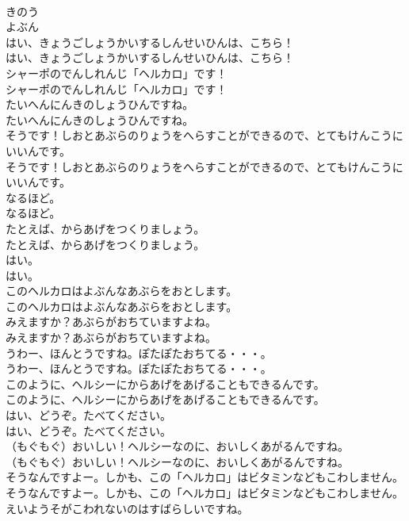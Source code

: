 \documentclass[8pt]{extreport}
\begin{document}
\begin{CJK}{UTF8}{min}
\\	きのう
\\	よぶん
\\	はい、きょうごしょうかいするしんせいひんは、こちら！	
\\	はい、きょうごしょうかいするしんせいひんは、こちら！ 
\\	シャーポのでんしれんじ「ヘルカロ」です！	
\\	シャーポのでんしれんじ「ヘルカロ」です！ 
\\	たいへんにんきのしょうひんですね。	
\\	たいへんにんきのしょうひんですね。 
\\	そうです！しおとあぶらのりょうをへらすことができるので、とてもけんこうにいいんです。	
\\	そうです！しおとあぶらのりょうをへらすことができるので、とてもけんこうにいいんです。 
\\	なるほど。	
\\	なるほど。 
\\	たとえば、からあげをつくりましょう。	
\\	たとえば、からあげをつくりましょう。 
\\	はい。	
\\	はい。 
\\	このヘルカロはよぶんなあぶらをおとします。	
\\	このヘルカロはよぶんなあぶらをおとします。 
\\	みえますか？あぶらがおちていますよね。	
\\	みえますか？あぶらがおちていますよね。 
\\	うわー、ほんとうですね。ぽたぽたおちてる・・・。	
\\	うわー、ほんとうですね。ぽたぽたおちてる・・・。 
\\	このように、ヘルシーにからあげをあげることもできるんです。	
\\	このように、ヘルシーにからあげをあげることもできるんです。 
\\	はい、どうぞ。たべてください。	
\\	はい、どうぞ。たべてください。 
\\	（もぐもぐ）おいしい！ヘルシーなのに、おいしくあがるんですね。	
\\	（もぐもぐ）おいしい！ヘルシーなのに、おいしくあがるんですね。 
\\	そうなんですよー。しかも、この「ヘルカロ」はビタミンなどもこわしません。	
\\	そうなんですよー。しかも、この「ヘルカロ」はビタミンなどもこわしません。 
\\	えいようそがこわれないのはすばらしいですね。	

\end{CJK}
\end{document}
